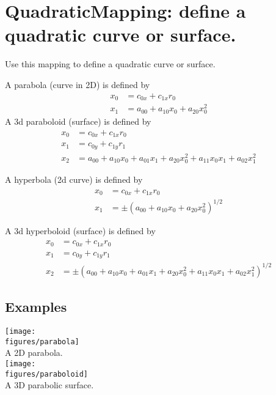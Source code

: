 \section{QuadraticMapping: define a quadratic curve or surface.}


Use this mapping to define a quadratic curve or surface.

A parabola (curve in 2D) is defined by
\begin{align*}
   x_0 &= c_{0x} + c_{1x} r_0 \\
   x_1 &= a_{00} + a_{10} x_0 + a_{20} x_0^2
\end{align*}
A 3d paraboloid (surface) is defined by
\begin{align*}
   x_0 &= c_{0x} + c_{1x} r_0 \\
   x_1 &= c_{0y} + c_{1y} r_1 \\
   x_2 &= a_{00} + a_{10} x_0 + a_{01} x_1 + a_{20} x_0^2 + a_{11}x_0 x_1 + a_{02} x_1^2
\end{align*}

A hyperbola (2d curve) is defined by
\begin{align*}
   x_0 &= c_{0x} + c_{1x} r_0 \\
   x_1 &= \pm (a_{00} + a_{10} x_0 + a_{20} x_0^2 )^{1/2}
\end{align*}

A 3d hyperboloid (surface) is defined by
\begin{align*}
   x_0 &= c_{0x} + c_{1x} r_0 \\
   x_1 &= c_{0y} + c_{1y} r_1 \\
   x_2 &= \pm (a_{00} + a_{10} x_0 + a_{01} x_1 + a_{20} x_0^2 + a_{11}x_0 x_1 + a_{02} x_1^2)^{1/2}
\end{align*}



\subsection{Examples}
  \begin{center}
  \texttt{[image: \\figures/parabola]} \\
  {A 2D parabola.} \\
  \texttt{[image: \\figures/paraboloid]} \\
  {A 3D parabolic surface.}
  \end{center}


